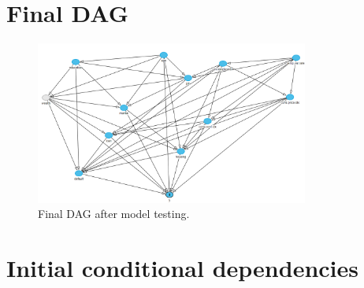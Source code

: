 \documentclass[11pt,]{article}
\begin{document}
\hypertarget{final-dag}{%
\section{Final DAG}\label{final-dag}}

\label{sec:final_dag}

\begin{figure}[h]
    \centering
    \includegraphics[width=0.8\textwidth]{images/final_dag}
    \caption{Final DAG after model testing.}
    \label{fig:final_dag}
\end{figure}

\newpage

\hypertarget{initial-conditional-dependencies}{%
\section{Initial conditional
dependencies}\label{initial-conditional-dependencies}}
\end{document}
